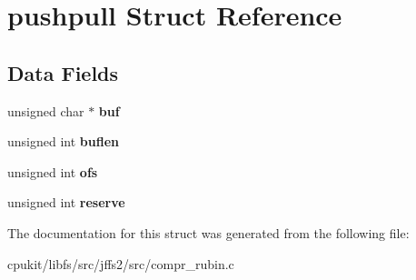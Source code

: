 \hypertarget{structpushpull}{}\section{pushpull Struct Reference}
\label{structpushpull}
\subsection*{Data Fields}
\begin{DoxyCompactItemize}
\item 
\mbox{\label{structpushpull_a78438898b624560d01f50d93d4d94f3d}} 
unsigned char $\ast$ {\bfseries buf}
\item 
\mbox{\label{structpushpull_a6092dcee5a3dfd902db1f250f87b7fa6}} 
unsigned int {\bfseries buflen}
\item 
\mbox{\label{structpushpull_a17416057405b6c12cd14dca9ffb15d00}} 
unsigned int {\bfseries ofs}
\item 
\mbox{\label{structpushpull_a4bfb0744c188a446e345c8cb7212622d}} 
unsigned int {\bfseries reserve}
\end{DoxyCompactItemize}


The documentation for this struct was generated from the following file\+:\begin{DoxyCompactItemize}
\item 
cpukit/libfs/src/jffs2/src/compr\+\_\+rubin.\+c\end{DoxyCompactItemize}
